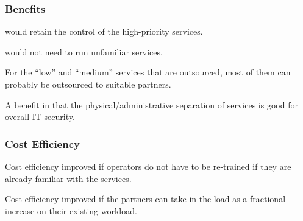 \documentclass[12pt,a4paper]{article}
\begin{document}
\subsubsection*{Benefits}
\bitm
  \item {\EC would retain the control of the high-priority services.}
  \item {\EC would not need to run unfamiliar services.}
  \item {For the ``low'' and ``medium'' services that are outsourced, most of them can probably be outsourced to suitable partners.}
  \item {A benefit in that the physical/administrative separation of services is good for overall IT security.}
\eitm

\subsubsection*{Cost Efficiency}
\bitm
  \item Cost efficiency improved if operators do not have to be re-trained if they are already familiar with the services.
  \item Cost efficiency improved if the partners can take in the \ED load as a fractional increase on their existing workload.
\eitm
\end{document}
